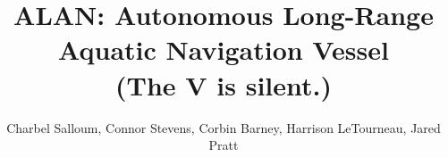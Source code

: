 \documentclass[11pt, journal]{IEEEtran}
\begin{document}

    \title{
        ALAN: Autonomous Long-Range Aquatic Navigation Vessel \\ 
        {\normalsize (The V is silent.)}
    }
    \author{
        Charbel Salloum, 
        Connor Stevens, 
        Corbin Barney, 
        Harrison LeTourneau, 
        Jared Pratt
    }

    \maketitle


    \begin{abstract}

    \end{abstract}


    
    
    
    
    
    
    


    \appendices
    
    


    
    
    
\end{document}
